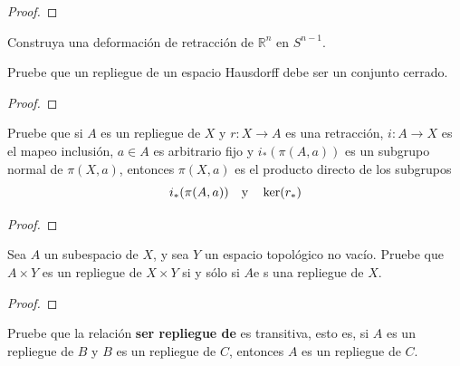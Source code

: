\documentclass[12pt]{report}
\theoremstyle{largebreak}
\newcommand\cf[3]{\ensuremath{#1:#2\rightarrow#3}}
\begin{document}
    \begin{proof}
        
    \end{proof}

    \begin{excer}
        Construya una deformación de retracción de $\mathbb{R}^n$ en $S^{ n-1}$.
    \end{excer}

    \begin{sol}
        
    \end{sol}

    \begin{excer}
        Pruebe que un repliegue de un espacio Hausdorff debe ser un conjunto cerrado.
    \end{excer}

    \begin{proof}
        
    \end{proof}

    \begin{excer}
        Pruebe que si $A$ es un repliegue de $X$ y $\cf{r}{X}{A}$ es una retracción, $\cf{i}{A}{X}$ es el mapeo inclusión, $a\in A$ es arbitrario fijo y $i_*(\pi(A,a))$ es un subgrupo normal de $\pi(X,a)$, entonces $\pi(X,a)$ es el producto directo de los subgrupos
        \begin{equation*}
            i_*(\pi(A,a))\quad\textup{y}\quad \ker(r_*)
        \end{equation*}
    \end{excer}

    \begin{proof}
        
    \end{proof}

    \begin{excer}
        Sea $A$ un subespacio de $X$, y sea $Y$ un espacio topológico no vacío. Pruebe que $A\times Y$ es un repliegue de $X\times Y$ si y sólo si $A$e s una repliegue de $X$.
    \end{excer}

    \begin{proof}
        
    \end{proof}

    \begin{excer}
        Pruebe que la relación \textbf{ser repliegue de} es transitiva, esto es, si $A$ es un repliegue de $B$ y $B$ es un repliegue de $C$, entonces $A$ es un repliegue de $C$.
    \end{excer}
\end{document}
